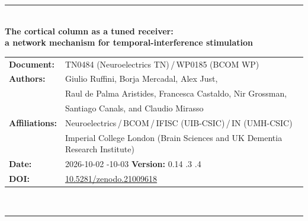 \documentclass[11pt,a4paper]{article}
\newif\ifsupp
\providecommand{\DIFaddtex}[1]{{\protect\color{blue} \sf #1}} %
\providecommand{\DIFdeltex}[1]{{\protect\color{red} \scriptsize #1}} %
\providecommand{\DIFaddbegin}{} %
\providecommand{\DIFaddend}{} %
\providecommand{\DIFdelbegin}{} %
\providecommand{\DIFdelend}{} %
\providecommand{\DIFadd}[1]{\texorpdfstring{\DIFaddtex{#1}}{#1}} %
\providecommand{\DIFdel}[1]{\texorpdfstring{\DIFdeltex{#1}}{}} %
\begin{document}
\vspace{6pt}
\else
\begin{flushleft}
{\color{neblue}\rule{\textwidth}{2pt}}\\[4pt]
{\LARGE\bfseries The cortical column as a tuned receiver:\\[2pt]
a network mechanism for temporal-interference stimulation}\\[10pt]
\begin{tabular}{@{}ll@{}}
\textbf{Document:} & TN0484 (Neuroelectrics TN)\,/\,WP0185 (BCOM WP) \\
\textbf{Authors:} & Giulio Ruffini, Borja Mercadal, Alex Just,\\
& Raul de Palma Aristides, Francesca Castaldo, Nir Grossman,\\
& Santiago Canals, and Claudio Mirasso \\
\textbf{Affiliations:} & Neuroelectrics\,/\,BCOM\,/\,IFISC (UIB-CSIC)\,/\,IN (UMH-CSIC)\\
& Imperial College London (Brain Sciences and UK Dementia Research Institute) \\
\textbf{Date:} & \DIFdelbegin \DIFdel{2026-10-02 }\DIFdelend \DIFaddbegin \DIFadd{2026-10-03 }\DIFaddend \qquad \textbf{Version:} 0.14\DIFdelbegin \DIFdel{.3 }\DIFdelend \DIFaddbegin \DIFadd{.4 }\DIFaddend \\
\textbf{DOI:} & \href{https://doi.org/10.5281/zenodo.21009618}{10.5281/zenodo.21009618} \\
\end{tabular}\\[4pt]
{\color{neblue}\rule{\textwidth}{1pt}}
\end{flushleft}
\fi

\ifsupp
\begin{center}
{\large\bfseries Supplementary Material}\\[4pt]
\begin{minipage}{0.86\textwidth}\centering\small
Appendices and supplementary figures accompanying the article. Section, equation and
figure numbers referenced here follow the main text; supplementary figures are numbered
S1, S2, \dots
\end{minipage}
\end{center}
\vspace{8pt}
\fi

\ifsupp\else
\end{document}
